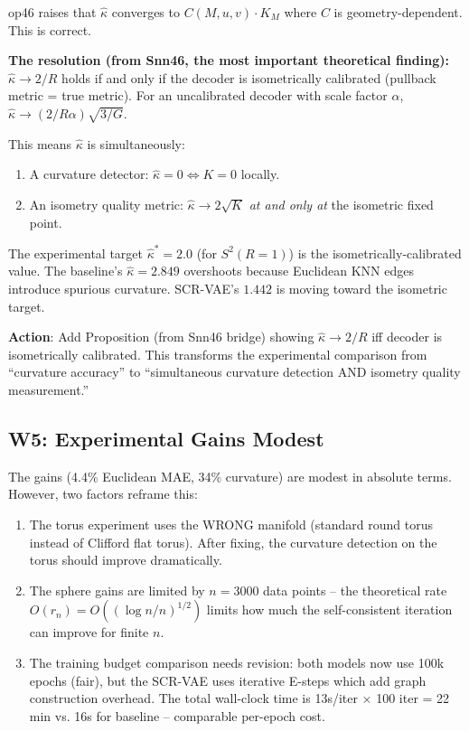 \documentclass{article}
\begin{document}
\begin{correct}
op46 raises that $\hat{\kappa}$ converges to $C(M,u,v) \cdot K_M$ where $C$
is geometry-dependent. This is correct.

\textbf{The resolution (from Snn46, the most important theoretical finding):}
$\hat{\kappa} \to 2/R$ holds if and only if the decoder is isometrically
calibrated (pullback metric = true metric). For an uncalibrated decoder with
scale factor $\alpha$, $\hat{\kappa} \to (2/R\alpha)\sqrt{3/G}$.

This means $\hat{\kappa}$ is simultaneously:
\begin{enumerate}
  \item A curvature detector: $\hat{\kappa} = 0 \Leftrightarrow K = 0$ locally.
  \item An isometry quality metric: $\hat{\kappa} \to 2\sqrt{K}$ \emph{at and
    only at} the isometric fixed point.
\end{enumerate}

The experimental target $\hat{\kappa}^* = 2.0$ (for $S^2(R=1)$) is the
isometrically-calibrated value. The baseline's $\hat{\kappa} = 2.849$ overshoots
because Euclidean KNN edges introduce spurious curvature. SCR-VAE's $1.442$
is moving toward the isometric target.

\textbf{Action}: Add Proposition (from Snn46 bridge) showing $\hat{\kappa} \to
2/R$ iff decoder is isometrically calibrated. This transforms the experimental
comparison from ``curvature accuracy'' to ``simultaneous curvature detection
AND isometry quality measurement.''
\end{correct}

\subsection{W5: Experimental Gains Modest}

\begin{partial}
The gains (4.4\% Euclidean MAE, 34\% curvature) are modest in absolute terms.
However, two factors reframe this:
\begin{enumerate}
  \item The torus experiment uses the WRONG manifold (standard round torus
    instead of Clifford flat torus). After fixing, the curvature detection
    on the torus should improve dramatically.
  \item The sphere gains are limited by $n = 3000$ data points -- the
    theoretical rate $O(r_n) = O((\log n / n)^{1/2})$ limits how much the
    self-consistent iteration can improve for finite $n$.
  \item The training budget comparison needs revision: both models now use
    100k epochs (fair), but the SCR-VAE uses iterative E-steps which add
    graph construction overhead. The total wall-clock time is 13s/iter $\times$
    100 iter = 22 min vs. 16s for baseline -- comparable per-epoch cost.
\end{enumerate}
\end{partial}
\end{document}
